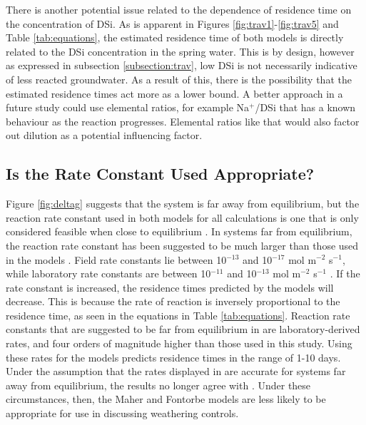 \FloatBarrier

There is another potential issue related to the dependence of residence time on the concentration of DSi. As is apparent in Figures \ref{fig:trav1}-\ref{fig:trav5} and Table \ref{tab:equations}, the estimated residence time of both models is directly related to the DSi concentration in the spring water. This is by design, however as expressed in subsection \ref{subsection:trav}, low DSi is not necessarily indicative of less reacted groundwater. As a result of this, there is the possibility that the estimated residence times act more as a lower bound. A better approach in a future study could use elemental ratios, for example Na$^+$/DSi that has a known behaviour as the reaction progresses. Elemental ratios like that would also factor out dilution as a potential influencing factor.


\subsection{Is the Rate Constant Used Appropriate?}

Figure \ref{fig:deltag} suggests that the system is far away from equilibrium, but the reaction rate constant used in both models for all calculations is one that is only considered feasible when close to equilibrium \parencite{kampmanFeldsparDissolutionKinetics2009}. In systems far from equilibrium, the reaction rate constant has been suggested to be much larger than those used in the models \parencite{whiteEffectTimeWeathering2003}. Field rate constants lie between 10$^{-13}$ and 10$^{-17}$ mol m$^{-2}$ s$^{-1}$, while laboratory rate constants are between 10$^{-11}$ and 10$^{-13}$ mol m$^{-2}$ s$^{-1}$ \parencite{whiteEffectTimeWeathering2003}. If the rate constant is increased, the residence times predicted by the models will decrease. This is because the rate of reaction is inversely proportional to the residence time, as seen in the equations in Table \ref{tab:equations}. Reaction rate constants that are suggested to be far from equilibrium in \textcite{kampmanFeldsparDissolutionKinetics2009} are laboratory-derived rates, and four orders of magnitude higher than those used in this study. Using these rates for the models predicts residence times in the range of 1-10 days. Under the assumption that the rates displayed in \textcite{kampmanFeldsparDissolutionKinetics2009} are accurate for systems far away from equilibrium, the results no longer agree with \textcite{atwoodCriticalZoneResponse2023}. Under these circumstances, then, the Maher and Fontorbe models are less likely to be appropriate for use in discussing weathering controls. 

